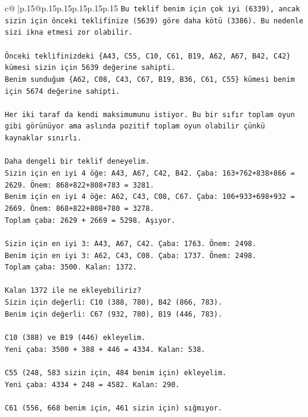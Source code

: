 \documentclass{article}
\begin{document}
{\begin{supertabular}{c@{$\;$}|p{.15\linewidth}@{}p{.15\linewidth}p{.15\linewidth}p{.15\linewidth}p{.15\linewidth}p{.15\linewidth}}
{{{\texttt{Bu teklif benim için çok iyi (6339), ancak sizin için önceki teklifinize (5639) göre daha kötü (3386). Bu nedenle sizi ikna etmesi zor olabilir.} \\
\\ 
\texttt{Önceki teklifinizdeki \{A43, C55, C10, C61, B19, A62, A67, B42, C42\} kümesi sizin için 5639 değerine sahipti.} \\
\texttt{Benim sunduğum \{A62, C08, C43, C67, B19, B36, C61, C55\} kümesi benim için 5674 değerine sahipti.} \\
\\ 
\texttt{Her iki taraf da kendi maksimumunu istiyor. Bu bir sıfır toplam oyun gibi görünüyor ama aslında pozitif toplam oyun olabilir çünkü kaynaklar sınırlı.} \\
\\ 
\texttt{Daha dengeli bir teklif deneyelim.} \\
\texttt{Sizin için en iyi 4 öğe: A43, A67, C42, B42. Çaba: 163+762+838+866 = 2629. Önem: 868+822+808+783 = 3281.} \\
\texttt{Benim için en iyi 4 öğe: A62, C43, C08, C67. Çaba: 106+933+698+932 = 2669. Önem: 868+822+808+780 = 3278.} \\
\texttt{Toplam çaba: 2629 + 2669 = 5298. Aşıyor.} \\
\\ 
\texttt{Sizin için en iyi 3: A43, A67, C42. Çaba: 1763. Önem: 2498.} \\
\texttt{Benim için en iyi 3: A62, C43, C08. Çaba: 1737. Önem: 2498.} \\
\texttt{Toplam çaba: 3500. Kalan: 1372.} \\
\\ 
\texttt{Kalan 1372 ile ne ekleyebiliriz?} \\
\texttt{Sizin için değerli: C10 (388, 780), B42 (866, 783).} \\
\texttt{Benim için değerli: C67 (932, 780), B19 (446, 783).} \\
\\ 
\texttt{C10 (388) ve B19 (446) ekleyelim.} \\
\texttt{Yeni çaba: 3500 + 388 + 446 = 4334. Kalan: 538.} \\
\\ 
\texttt{C55 (248, 583 sizin için, 484 benim için) ekleyelim.} \\
\texttt{Yeni çaba: 4334 + 248 = 4582. Kalan: 290.} \\
\\ 
\texttt{C61 (556, 668 benim için, 461 sizin için) sığmıyor.} \\
}}}
\end{supertabular}}
\end{document}
